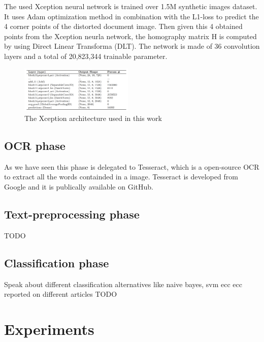 \documentclass[10pt,twocolumn,letterpaper]{article}
\begin{document}
The used Xception neural network is trained over 1.5M synthetic images dataset. It uses Adam optimization method in combination with the L1-loss to predict the 4 corner points of the distorted document image. Then given this 4 obtained points from the Xception neurla network, the homography matrix H is computed by using Direct Linear Transforma (DLT). The network is made of 36 convolution layers and a total of 20,823,344 trainable parameter.

\begin{figure}[h]
	\centering
	\includegraphics[width=0.48\textwidth]{images/xception-architecture.png}
	\caption{The Xception architecture used in this work}
	\label{xception-architecture}
\end{figure}

\subsection{OCR phase}
As we have seen this phase is delegated to Tesseract, which is a open-source OCR to extract all the words containded in a image. Tesseract is developed from Google and it is publically available on GitHub. 

\subsection{Text-preprocessing phase}
TODO

\subsection{Classification phase}
Speak about different classification alternatives like naive bayes, svm ecc ecc reported on different  articles TODO


\section{Experiments}
\end{document}
